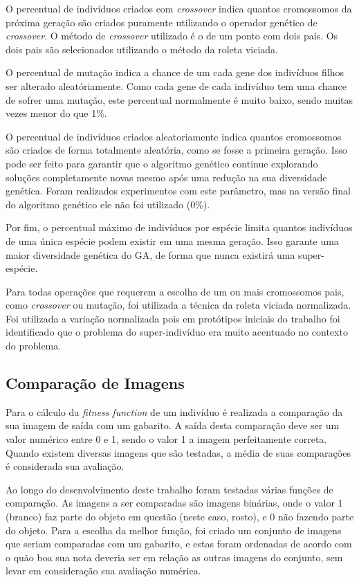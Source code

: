 \documentclass[12pt,oneside,a4paper,english,french,spanish,brazil,]{abntex2}
\begin{document}
O percentual de indivíduos criados com \textit{crossover} indica quantos cromossomos da próxima geração são criados puramente utilizando o operador genético de \textit{crossover}. O método de \textit{crossover} utilizado é o de um ponto com dois pais. Os dois pais são selecionados utilizando o método da roleta viciada.

O percentual de mutação indica a chance de um cada gene dos indivíduos filhos ser alterado aleatóriamente. Como cada gene de cada indivíduo tem uma chance de sofrer uma mutação, este percentual normalmente é muito baixo, sendo muitas vezes menor do que 1\%.

O percentual de indivíduos criados aleatoriamente indica quantos cromossomos são criados de forma totalmente aleatória, como se fosse a primeira geração. Isso pode ser feito para garantir que o algoritmo genético continue explorando soluções completamente novas mesmo após uma redução na sua diversidade genética. Foram realizados experimentos com este parâmetro, mas na versão final do algoritmo genético ele não foi utilizado (0\%).

Por fim, o percentual máximo de indivíduos por espécie limita quantos indivíduos de uma única espécie podem existir em uma mesma geração. Isso garante uma maior diversidade genética do GA, de forma que nunca existirá uma super-espécie.

Para todas operações que requerem a escolha de um ou mais cromossomos pais, como \textit{crossover} ou mutação, foi utilizada a técnica da roleta viciada normalizada. Foi utilizada a variação normalizada pois em protótipos iniciais do trabalho foi identificado que o problema do super-indivíduo era muito acentuado no contexto do problema.

\subsection{Comparação de Imagens}

Para o cálculo da \textit{fitness function} de um indivíduo é realizada a comparação da sua imagem de saída com um gabarito. A saída desta comparação deve ser um valor numérico entre 0 e 1, sendo o valor 1 a imagem perfeitamente correta. Quando existem diversas imagens que são testadas, a média de suas comparações é considerada sua avaliação.

Ao longo do desenvolvimento deste trabalho foram testadas várias funções de comparação. As imagens a ser comparadas são imagens binárias, onde o valor 1 (branco) faz parte do objeto em questão (neste caso, rosto), e 0 não fazendo parte do objeto. Para a escolha da melhor função, foi criado um conjunto de imagens que seriam comparadas com um gabarito, e estas foram ordenadas de acordo com o quão boa sua nota deveria ser em relação as outras imagens do conjunto, sem levar em consideração sua avaliação numérica.
\end{document}
